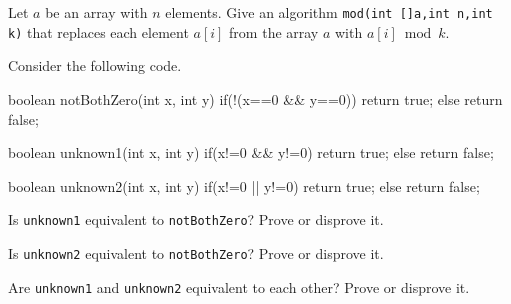 \begin{pro}
Let $a$ be an array with $n$ elements.
Give an algorithm \verb+mod(int []a,int n,int k)+ that 
replaces each element $a[i]$ from the array $a$ with $a[i]\bmod k$. 
\end{pro}
\begin{pro}
Consider the following code.
{\small
\begin{code}
	boolean notBothZero(int x, int y) {
	    if(!(x==0 && y==0)) {
	        return true;
	    } else {
	        return false;
	    }
	}
	
	boolean unknown1(int x, int y) {
	    if(x!=0 && y!=0) {
	        return true;
	    } else {
	        return false;
	    }
	}
	
	boolean unknown2(int x, int y) {
	    if(x!=0 || y!=0) {
	        return true;
	    } else {
	        return false;
	    }
	}
\end{code}
}
\begin{lenum}
\item
Is \verb+unknown1+ equivalent to \verb+notBothZero+? Prove or disprove it.
\item
Is \verb+unknown2+ equivalent to \verb+notBothZero+? Prove or disprove it.
\item
Are \verb+unknown1+  and \verb+unknown2+ equivalent to each other? Prove or disprove it.
\end{lenum}
\end{pro}


